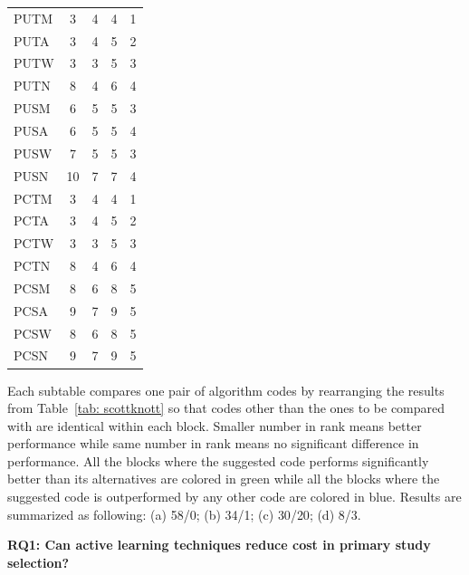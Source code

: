 \documentclass{svjour3}
\theoremstyle{break}
\begin{document}
\begin{table}
\begin{center}
{{{\begin{tabular}{l@{~~~}|c@{~~~}c@{~~~}c@{~~~}c}
PUTM & 3 &\cellcolor{blue!50} 4 & \cellcolor{green!40}4 &\cellcolor{green!40} 1\\
PUTA & 3 & 4 & 5 & 2\\
PUTW & 3 & 3 & 5 & 3\\
PUTN & 8 & 4 & 6 & 4\\
\hline
PUSM & 6 & 5 & 5 & 3\\
PUSA & 6 & 5 & 5 & 4\\
PUSW & 7 & 5 & 5 & 3\\
PUSN & 10 & 7 & 7 & 4\\
\hline
PCTM & 3 & \cellcolor{blue!50}4 & \cellcolor{green!40}4 &\cellcolor{green!40} 1\\
PCTA & 3 & 4 & 5 & 2\\
PCTW & 3 & 3 & 5 & 3\\
PCTN & 8 & 4 & 6 & 4\\
\hline
PCSM & 8 & 6 & 8 & 5\\
PCSA & 9 & 7 & 9 & 5\\
PCSW & 8 & 6 & 8 & 5\\
PCSN & 9 & 7 & 9 & 5\\
\hline
\end{tabular}}
}}
\end{center}
{\footnotesize Each subtable compares one pair of algorithm codes by rearranging the results from Table~\ref{tab: scottknott} so that codes other than the ones to be compared with are identical within each block. Smaller number in rank means better performance while same number in rank means no significant difference in performance. All the blocks where the suggested code performs significantly better than its alternatives are colored in {\setlength{\fboxsep}{1pt}\colorbox{green!40}{green}} while all the blocks where the suggested code is outperformed by any other code are colored in {\setlength{\fboxsep}{1pt}\colorbox{blue!50}{blue}}. Results are summarized as following: (a) {\setlength{\fboxsep}{1pt}\colorbox{green!40}{58}}/{\setlength{\fboxsep}{1pt}\colorbox{blue!50}{0}}; (b) {\setlength{\fboxsep}{1pt}\colorbox{green!40}{34}}/{\setlength{\fboxsep}{1pt}\colorbox{blue!50}{1}}; (c) {\setlength{\fboxsep}{1pt}\colorbox{green!40}{30}}/{\setlength{\fboxsep}{1pt}\colorbox{blue!50}{20}}; (d) {\setlength{\fboxsep}{1pt}\colorbox{green!40}{8}/\colorbox{blue!50}{3}}.
}
\end{table}


{\bf RQ1: Can active learning techniques reduce cost in primary study selection?} 
\end{document}
